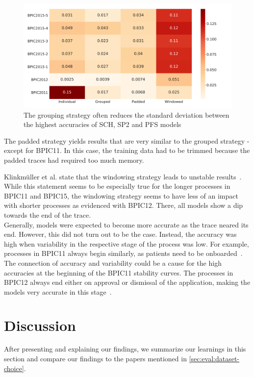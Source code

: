 \begin{figure}
    \centering
    \includegraphics[width=\textwidth]{gfx/grouping-accuracy-harmonization.pdf}
    \caption[Batching strategy harmonizes top accuracies]{The grouping strategy often reduces the standard deviation between the highest accuracies of SCH, SP2 and PFS models}
    \label{fig:grouping-accuracy-harmonization}
\end{figure}

The padded strategy yields results that are very similar to the grouped strategy - except for BPIC11. In this case, the training data had to be trimmed because the padded traces had required too much memory.

Klinkmüller et al. state that the windowing strategy leads to unstable results~\cite{klinkmuller2018reliablemonitoring}. While this statement seems to be especially true for the longer processes in BPIC11 and BPIC15, the windowing strategy seems to have less of an impact with shorter processes as evidenced with BPIC12. There, all models show a dip towards the end of the trace.\\

Generally, models were expected to become more accurate as the trace neared its end. However, this did not turn out to be the case. Instead, the accuracy was high when variability in the respective stage of the process was low. For example, processes in BPIC11 always begin similarly, as patients need to be onboarded~\cite{bose2011analysis}. The connection of accuracy and variability could be a cause for the high accuracies at the beginning of the BPIC11 stability curves. The processes in BPIC12 always end either on approval or dismissal of the application, making the models very accurate in this stage~\cite{adriansyah2012mining}.

\section{Discussion}\label{sec:eval:discussion}
After presenting and explaining our findings, we summarize our learnings in this section and compare our findings to the papers mentioned in \autoref{sec:eval:dataset-choice}.\\

